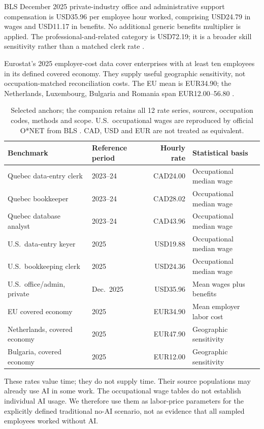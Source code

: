 \documentclass[11pt,a4paper]{article}
\newcommand{\smalltable}{\small\setlength{\tabcolsep}{5pt}}
\begin{document}
BLS December 2025 private-industry office and administrative support compensation is USD35.96 per employee hour worked, comprising USD24.79 in wages and USD11.17 in benefits. No additional generic benefits multiplier is applied. The professional-and-related category is USD72.19; it is a broader skill sensitivity rather than a matched clerk rate \citep{bls2025ecec}.

Eurostat's 2025 employer-cost data cover enterprises with at least ten employees in its defined covered economy. They supply useful geographic sensitivity, not occupation-matched reconciliation costs. The EU mean is EUR34.90; the Netherlands, Luxembourg, Bulgaria and Romania span EUR12.00--56.80 \citep{eurostat2025labourcost,eurostat2025labourcost_methods}.

\begin{table}[H]\centering\smalltable
\begin{tabularx}{\linewidth}{Yp{.17\linewidth}rp{.25\linewidth}}
\toprule
Benchmark & Reference period & Hourly rate & Statistical basis\\
\midrule
Quebec data-entry clerk & 2023--24 & CAD24.00 & Occupational median wage\\
Quebec bookkeeper & 2023--24 & CAD28.02 & Occupational median wage\\
Quebec database analyst & 2023--24 & CAD43.96 & Occupational median wage\\
U.S.\ data-entry keyer & 2025 & USD19.88 & Occupational median wage\\
U.S.\ bookkeeping clerk & 2025 & USD24.36 & Occupational median wage\\
U.S.\ office/admin, private & Dec.\ 2025 & USD35.96 & Mean wages plus benefits\\
EU covered economy & 2025 & EUR34.90 & Mean employer labor cost\\
Netherlands, covered economy & 2025 & EUR47.90 & Geographic sensitivity\\
Bulgaria, covered economy & 2025 & EUR12.00 & Geographic sensitivity\\
\bottomrule
\end{tabularx}
\caption{Selected anchors; the companion retains all 12 rate series, sources, occupation codes, methods and scope. U.S.\ occupational wages are reproduced by official O*NET from BLS \citep{onet_dataentry2026,onet_bookkeeping2026}. CAD, USD and EUR are not treated as equivalent.}
\label{tab:wages}
\end{table}

These rates value time; they do not supply time. Their source populations may already use AI in some work. The occupational wage tables do not establish individual AI usage. We therefore use them as labor-price parameters for the explicitly defined traditional no-AI scenario, not as evidence that all sampled employees worked without AI.
\end{document}
